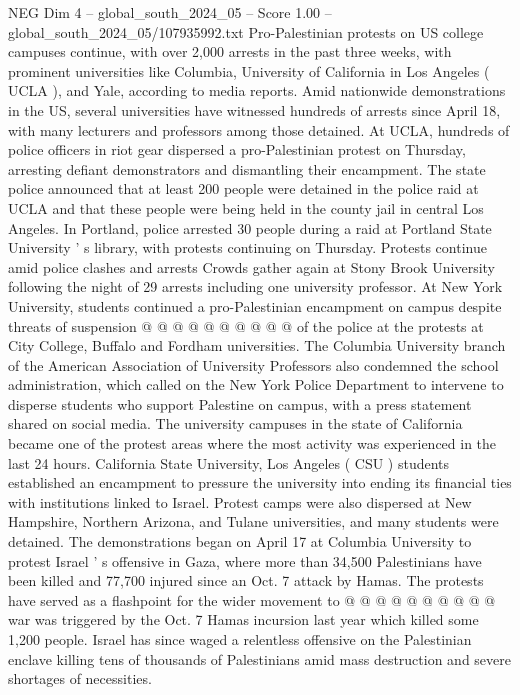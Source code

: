 \begin{textsample}{NEG Dim 4 – global\_south\_2024\_05 – Score 1.00 – global\_south\_2024\_05/107935992.txt}  \label{ex:f4_neg_275}
Pro-Palestinian protests on US college campuses continue, with over 2,000 arrests in the past three weeks, with prominent universities like Columbia, University of California in Los Angeles ( UCLA ), and Yale, according to media reports.
Amid nationwide demonstrations in the US, several universities have witnessed hundreds of arrests since April 18, with many lecturers and professors among those detained.
At UCLA, hundreds of police officers in riot gear dispersed a pro-Palestinian protest on Thursday, arresting defiant demonstrators and dismantling their encampment.
The state police announced that at least 200 people were detained in the police raid at UCLA and that these people were being held in the county jail in central Los Angeles.
In Portland, police arrested 30 people during a raid at Portland State University ' s library, with protests continuing on Thursday.
Protests continue amid police clashes and arrests Crowds gather again at Stony Brook University following the night of 29 arrests including one university professor.
At New York University, students continued a pro-Palestinian encampment on campus despite threats of suspension @ @ @ @ @ @ @ @ @ @ of the police at the protests at City College, Buffalo and Fordham universities.
The Columbia University branch of the American Association of University Professors also condemned the school administration, which called on the New York Police Department to intervene to disperse students who support Palestine on campus, with a press statement shared on social media.
The university campuses in the state of California became one of the protest areas where the most activity was experienced in the last 24 hours.
California State University, Los Angeles ( CSU ) students established an encampment to pressure the university into ending its financial ties with institutions linked to Israel.
Protest camps were also dispersed at New Hampshire, Northern Arizona, and Tulane universities, and many students were detained.
The demonstrations began on April 17 at Columbia University to protest Israel ' s offensive in Gaza, where more than 34,500 Palestinians have been killed and 77,700 injured since an Oct. 7 attack by Hamas.
The protests have served as a flashpoint for the wider movement to @ @ @ @ @ @ @ @ @ @ war was triggered by the Oct. 7 Hamas incursion last year which killed some 1,200 people.
Israel has since waged a relentless offensive on the Palestinian enclave killing tens of thousands of Palestinians amid mass destruction and severe shortages of necessities.

\end{textsample}
